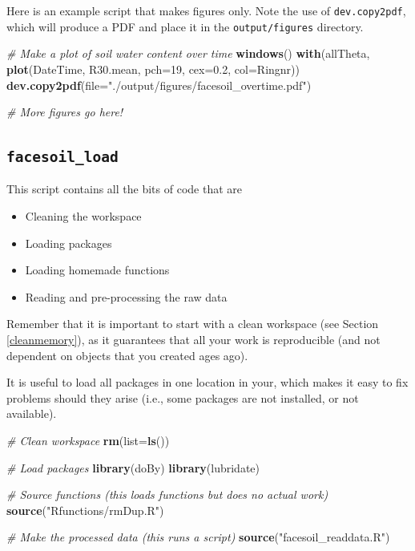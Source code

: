 \documentclass[]{book}
\newenvironment{Shaded}{\begin{snugshade}}{\end{snugshade}}
\newcommand{\CommentTok}[1]{\textcolor[rgb]{0.56,0.35,0.01}{\textit{#1}}}
\newcommand{\DataTypeTok}[1]{\textcolor[rgb]{0.13,0.29,0.53}{#1}}
\newcommand{\DecValTok}[1]{\textcolor[rgb]{0.00,0.00,0.81}{#1}}
\newcommand{\FloatTok}[1]{\textcolor[rgb]{0.00,0.00,0.81}{#1}}
\newcommand{\KeywordTok}[1]{\textcolor[rgb]{0.13,0.29,0.53}{\textbf{#1}}}
\newcommand{\NormalTok}[1]{#1}
\newcommand{\StringTok}[1]{\textcolor[rgb]{0.31,0.60,0.02}{#1}}
\providecommand{\tightlist}{%
  \setlength{\itemsep}{0pt}\setlength{\parskip}{0pt}}
\begin{document}
Here is an example script that makes figures only. Note the use of \texttt{dev.copy2pdf}, which will produce a PDF and place it in the \texttt{output/figures} directory.

\begin{Shaded}
\begin{Highlighting}[]
\CommentTok{# Make a plot of soil water content over time}
\KeywordTok{windows}\NormalTok{()}
\KeywordTok{with}\NormalTok{(allTheta, }\KeywordTok{plot}\NormalTok{(DateTime, R30.mean, }\DataTypeTok{pch=}\DecValTok{19}\NormalTok{, }\DataTypeTok{cex=}\FloatTok{0.2}\NormalTok{,}
                    \DataTypeTok{col=}\NormalTok{Ringnr))}
\KeywordTok{dev.copy2pdf}\NormalTok{(}\DataTypeTok{file=}\StringTok{"./output/figures/facesoil_overtime.pdf"}\NormalTok{)}

\CommentTok{# More figures go here!}
\end{Highlighting}
\end{Shaded}

\hypertarget{facesoil_load}{%
\subsection{\texorpdfstring{\texttt{facesoil\_load}}{facesoil\_load}}\label{facesoil_load}}

This script contains all the bits of code that are

\begin{itemize}
\tightlist
\item
  Cleaning the workspace
\item
  Loading packages
\item
  Loading homemade functions
\item
  Reading and pre-processing the raw data
\end{itemize}

Remember that it is important to start with a clean workspace (see Section \ref{cleanmemory}), as it guarantees that all your work is reproducible (and not dependent on objects that you created ages ago).

It is useful to load all packages in one location in your, which makes it easy to fix problems should they arise (i.e., some packages are not installed, or not available).

\begin{Shaded}
\begin{Highlighting}[]
\CommentTok{# Clean workspace}
\KeywordTok{rm}\NormalTok{(}\DataTypeTok{list=}\KeywordTok{ls}\NormalTok{())}

\CommentTok{# Load packages}
\KeywordTok{library}\NormalTok{(doBy)}
\KeywordTok{library}\NormalTok{(lubridate)}

\CommentTok{# Source functions (this loads functions but does no actual work)}
\KeywordTok{source}\NormalTok{(}\StringTok{"Rfunctions/rmDup.R"}\NormalTok{)}

\CommentTok{# Make the processed data (this runs a script)}
\KeywordTok{source}\NormalTok{(}\StringTok{"facesoil_readdata.R"}\NormalTok{)}
\end{Highlighting}
\end{Shaded}
\end{document}
